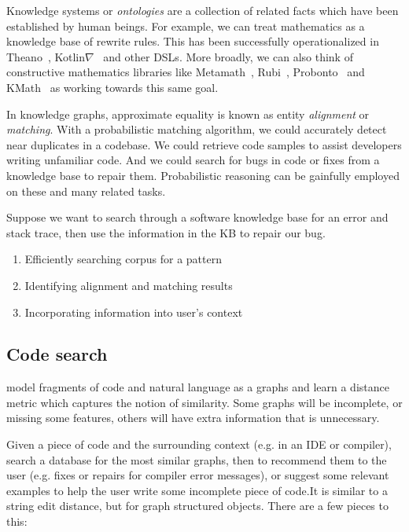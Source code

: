 \documentclass[11pt]{article}
\begin{document}
    Knowledge systems or \textit{ontologies} are a collection of related facts which have been established by human beings. For example, we can treat mathematics as a knowledge base of rewrite rules. This has been successfully operationalized in Theano~\citep{bergstra2010theano}, Kotlin$\nabla$~\citep{considine2019kotlingrad} and other DSLs. More broadly, we can also think of constructive mathematics libraries like Metamath~\citep{megill2006metamath}, Rubi~\citep{rich2009knowledge}, Probonto~\citep{swat2016probonto} and KMath~\citep{nozik2019kotlin} as working towards this same goal.

    In knowledge graphs, approximate equality is known as entity \textit{alignment} or \textit{matching}. With a probabilistic matching algorithm, we could accurately detect near duplicates in a codebase. We could retrieve code samples to assist developers writing unfamiliar code. And we could search for bugs in code or fixes from a knowledge base to repair them. Probabilistic reasoning can be gainfully employed on these and many related tasks.

    Suppose we want to search through a software knowledge base for an error and stack trace, then use the information in the KB to repair our bug.

    \begin{enumerate}
        \item Efficiently searching corpus for a pattern
        \item Identifying alignment and matching results
        \item Incorporating information into user's context
    \end{enumerate}

    \subsection{Code search}

    model fragments of code and natural language as a graphs and learn a distance metric which captures the notion of similarity. Some graphs will be incomplete, or missing some features, others will have extra information that is unnecessary.

    Given a piece of code and the surrounding context (e.g. in an IDE or compiler), search a database for the most similar graphs, then to recommend them to the user (e.g. fixes or repairs for compiler error messages), or suggest some relevant examples to help the user write some incomplete piece of code.It is similar to a string edit distance, but for graph structured objects. There are a few pieces to this:
\end{document}
